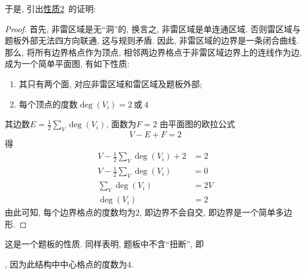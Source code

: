\documentclass{ctexart}
\newcommand{\varible}[1]{{\Noto[#1]}}
\begin{document}
于是, 引出\hyperref[p2]{性质2}\ 的证明:
\begin{proof}
    \label{proof:SimplePolygon}
    首先, 非雷区域是无``洞''的, 换言之, 非雷区域是单连通区域. 否则雷区域与题板外部无法四方向联通, 这与\varible{O}规则矛盾. 因此, 非雷区域的边界是一条闭合曲线.
    那么, 将所有边界格点作为顶点, 相邻两边界格点于非雷区域边界上的连线作为边, 成为一个简单平面图, 有如下性质:
    \begin{enumerate}
        \item 其只有两个面, 对应非雷区域和雷区域及题板外部;
        \item 每个顶点的度数$\deg(V_i) = 2\ \text{或}\ 4$
    \end{enumerate}
    其边数$\displaystyle E = \frac{1}{2}\sum_{V}\deg(V_i)$, 面数为$F = 2$
    由平面图的欧拉公式
    $$
    V - E + F = 2
    $$
    得
    \begin{align*}
        V - \frac{1}{2}\sum_{V}\deg(V_i) + 2 &= 2 \\
            V - \frac{1}{2}\sum_{V}\deg(V_i) &= 0 \\
                           \sum_{V}\deg(V_i) &= 2V\\
                                   \deg(V_i) &= 2
    \end{align*}
    由此可知, 每个边界格点的度数均为2, 即边界不会自交, 即边界是一个简单多边形.
\end{proof}
这是一个\varible{O}题板的性质. 同样表明, \varible{O}题板中不含``扭断'', 即
,
因为此结构中中心格点的度数为4.
\end{document}
